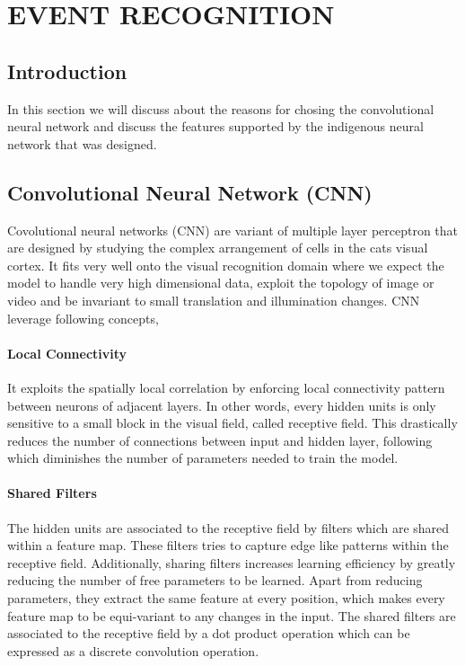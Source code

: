 \chapter{EVENT RECOGNITION}

\section{Introduction}
 In this section we will discuss about the reasons for chosing the convolutional neural network and discuss the features supported by the indigenous neural network that was designed.
 \section{Convolutional Neural Network (CNN)}
 Covolutional neural networks (CNN) are variant of multiple layer perceptron that are designed by studying the complex arrangement of cells in the cats visual cortex. It fits very well onto the visual recognition domain where we expect the model to handle very high dimensional data, exploit the topology of image or video and be invariant to small translation and illumination changes. CNN leverage following concepts,
\subsubsection{Local Connectivity}
It exploits the spatially local correlation by enforcing local connectivity pattern between neurons of adjacent layers. In other words, every hidden units is only sensitive to a small block in  the visual field, called receptive field. This drastically reduces the number of connections between input and hidden layer, following which diminishes the number of parameters needed to train the model.
\subsubsection{Shared Filters}
The hidden units are associated to the receptive field by filters which are shared within a feature map. These filters tries to capture edge like patterns within the receptive field. Additionally, sharing filters increases learning efficiency by greatly reducing the number of free parameters to be learned. Apart from reducing parameters, they extract the same feature at every position, which makes every feature map to be equi-variant to any changes in the input. The shared filters are associated to the receptive field by a dot product operation which can be expressed as a discrete convolution operation.
